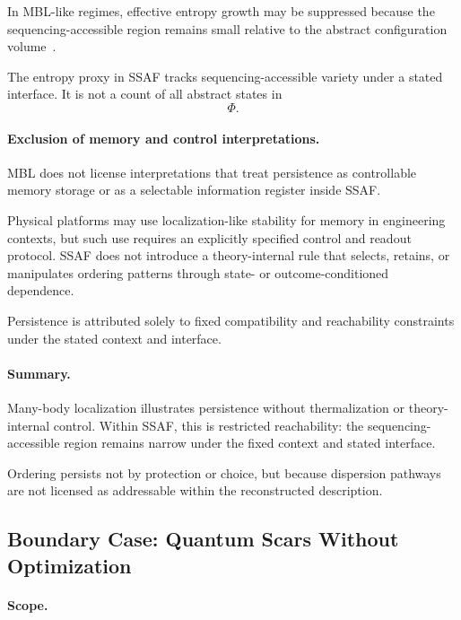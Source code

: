 \documentclass[aps,prx,onecolumn,11pt]{revtex4-2}
\theoremstyle{plain}
\theoremstyle{definition}
\theoremstyle{remark}
\begin{document}
In MBL-like regimes, effective entropy growth may be suppressed because
the sequencing-accessible region remains small relative to the abstract
configuration volume~\cite{Serbyn2013,Huse2014}.

The entropy proxy in SSAF tracks sequencing-accessible variety under a
stated interface. It is not a count of all abstract states in
\[
\Phi.
\]

\paragraph{Exclusion of memory and control interpretations.}

MBL does not license interpretations that treat persistence as
controllable memory storage or as a selectable information register
inside SSAF.

Physical platforms may use localization-like stability for memory in
engineering contexts, but such use requires an explicitly specified
control and readout protocol. SSAF does not introduce a theory-internal
rule that selects, retains, or manipulates ordering patterns through
state- or outcome-conditioned dependence.

Persistence is attributed solely to fixed compatibility and reachability
constraints under the stated context and interface.

\paragraph{Summary.}

Many-body localization illustrates persistence without thermalization
or theory-internal control. Within SSAF, this is restricted
reachability: the sequencing-accessible region remains narrow under the
fixed context and stated interface.

Ordering persists not by protection or choice, but because dispersion
pathways are not licensed as addressable within the reconstructed
description.

\subsection{Boundary Case: Quantum Scars Without Optimization}
\label{subsec:quantum_scars_boundary}

\paragraph{Scope.}
\end{document}
